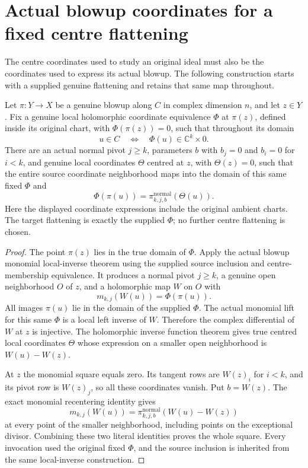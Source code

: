 \section{Actual blowup coordinates for a fixed centre flattening}
\label{sec:hironaka-actual-fixed-flattening-blowup-coordinates}

The centre coordinates used to study an original ideal must also be
the coordinates used to express its actual blowup. The following
construction starts with a supplied genuine flattening and retains
that same map throughout.

\begin{theorem}
\label{hir:actual-fixed-flattening-blowup-coordinate-square}
\leanok
Let $\pi:Y\to X$ be a genuine blowup along $C$ in complex dimension
$n$, and let $z\in Y$. Fix a genuine local holomorphic coordinate
equivalence $\Phi$ at $\pi(z)$, defined inside its original chart,
with $\Phi(\pi(z))=0$, such that throughout its domain
\[
 u\in C\quad\Longleftrightarrow\quad
 \Phi(u)\in\mathbb C^k\times0.
\]
There are an actual normal pivot $j\ge k$, parameters $b$ with
$b_j=0$ and $b_i=0$ for $i<k$, and genuine local coordinates
$\Theta$ centred at $z$, with $\Theta(z)=0$, such that the entire
source coordinate neighborhood maps into the domain of this same
fixed $\Phi$ and
\[
 \Phi(\pi(u))=
 \pi^{\mathrm{normal}}_{k,j,b}(\Theta(u)).
\]
Here the displayed coordinate expressions include the original
ambient charts. The target flattening is exactly the supplied
$\Phi$; no further centre flattening is chosen.
\end{theorem}
\begin{proof}
The point $\pi(z)$ lies in the true domain of $\Phi$. Apply the
actual blowup monomial local-inverse theorem using the supplied
source inclusion and centre-membership equivalence. It produces a
normal pivot $j\ge k$, a genuine open neighborhood $O$ of $z$,
and a holomorphic map $W$ on $O$ with
\[
 m_{k,j}(W(u))=\Phi(\pi(u)).
\]
All images $\pi(u)$ lie in the domain of the supplied $\Phi$.
The actual monomial lift for this same $\Phi$ is a local left
inverse of $W$. Therefore the complex differential of $W$ at $z$
is injective. The holomorphic inverse function theorem gives true
centred local coordinates $\Theta$ whose expression on a smaller
open neighborhood is $W(u)-W(z)$.

At $z$ the monomial square equals zero. Its tangent rows are
$W(z)_i$ for $i<k$, and its pivot row is $W(z)_j$, so all these
coordinates vanish. Put $b=W(z)$. The exact monomial recentering
identity gives
\[
 m_{k,j}(W(u))=
 \pi^{\mathrm{normal}}_{k,j,b}(W(u)-W(z))
\]
at every point of the smaller neighborhood, including points on
the exceptional divisor. Combining these two literal identities
proves the whole square. Every invocation used the original fixed
$\Phi$, and the source inclusion is inherited from the same
local-inverse construction.
\end{proof}

